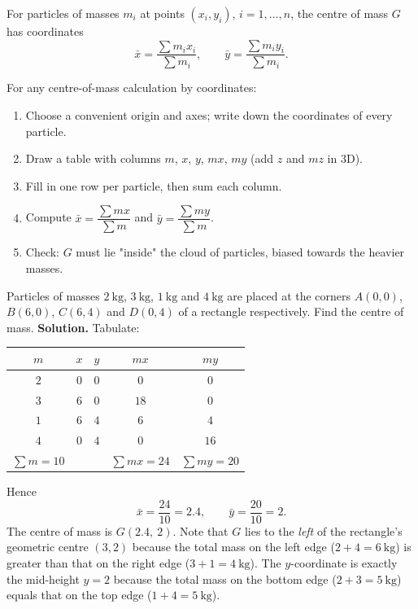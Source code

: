 \documentclass[11pt]{article}
\begin{document}
\begin{definition}
For particles of masses $m_i$ at points $(x_i, y_i)$, $i = 1, \dots, n$, the centre of mass $G$ has coordinates
\[
\bar{x} = \frac{\sum m_i x_i}{\sum m_i}, \qquad \bar{y} = \frac{\sum m_i y_i}{\sum m_i}.
\]
\end{definition}

\begin{methode}
For any centre-of-mass calculation by coordinates:
\begin{enumerate}
\item Choose a convenient origin and axes; write down the coordinates of every particle.
\item Draw a table with columns $m$, $x$, $y$, $mx$, $my$ (add $z$ and $mz$ in 3D).
\item Fill in one row per particle, then sum each column.
\item Compute $\bar{x} = \dfrac{\sum mx}{\sum m}$ and $\bar{y} = \dfrac{\sum my}{\sum m}$.
\item Check: $G$ must lie "inside" the cloud of particles, biased towards the heavier masses.
\end{enumerate}
\end{methode}

\begin{exoresolu}
Particles of masses $2\ \mathrm{kg}$, $3\ \mathrm{kg}$, $1\ \mathrm{kg}$ and $4\ \mathrm{kg}$ are placed at the corners $A(0,0)$, $B(6,0)$, $C(6,4)$ and $D(0,4)$ of a rectangle respectively. Find the centre of mass.
\tcblower
\textbf{Solution.} Tabulate:
\begin{center}
\begin{tabular}{|c|c|c|c|c|}
\hline
\rowcolor{popblueL} $m$ & $x$ & $y$ & $mx$ & $my$ \\
\hline
$2$ & $0$ & $0$ & $0$ & $0$ \\
\hline
$3$ & $6$ & $0$ & $18$ & $0$ \\
\hline
$1$ & $6$ & $4$ & $6$ & $4$ \\
\hline
$4$ & $0$ & $4$ & $0$ & $16$ \\
\hline
\rowcolor{popblueL} $\sum m = 10$ & & & $\sum mx = 24$ & $\sum my = 20$ \\
\hline
\end{tabular}
\end{center}
Hence
\[
\bar{x} = \frac{24}{10} = 2.4, \qquad \bar{y} = \frac{20}{10} = 2.
\]
The centre of mass is $G(2.4,\ 2)$. Note that $G$ lies to the \emph{left} of the rectangle's geometric centre $(3,2)$ because the total mass on the left edge ($2+4=6\ \mathrm{kg}$) is greater than that on the right edge ($3+1=4\ \mathrm{kg}$). The $y$-coordinate is exactly the mid-height $y=2$ because the total mass on the bottom edge ($2+3=5\ \mathrm{kg}$) equals that on the top edge ($1+4=5\ \mathrm{kg}$).
\end{exoresolu}
\end{document}
